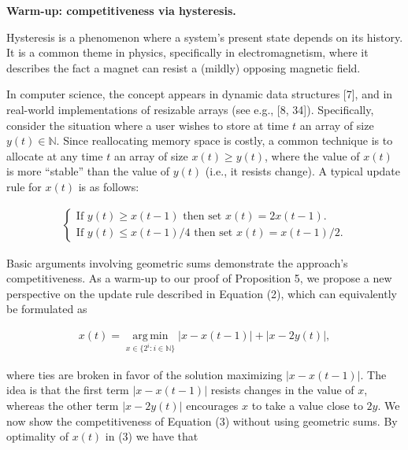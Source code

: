 


\par\medskip\noindent\textbf{Warm-up: competitiveness via hysteresis.}\par




Hysteresis is a phenomenon where a system’s present state depends on its history. It is a common theme in physics, specifically in electromagnetism, where it describes the fact a magnet can resist a (mildly) opposing magnetic field.\par




In computer science, the concept appears in dynamic data structures [7], and in real-world implementations of resizable arrays (see e.g., [8, 34]). Specifically, consider the situation where a user wishes to store at time $t$ an array of size $y(t)\in\mathbb{N}$. Since reallocating memory space is costly, a common technique is to allocate at any time $t$ an array of size $x(t)\geq y(t)$, where the value of $x(t)$ is more “stable” than the value of $y(t)$ (i.e., it resists change). A typical update rule for $x(t)$ is as follows:\par


\[\begin{gathered}
\begin{cases}\text{If }y(t)\geq x(t-1)\text{ then set }x(t)=2x(t-1).\\
\text{If }y(t)\leq x(t-1)/4\text{ then set }x(t)=x(t-1)/2.\end{cases}
\end{gathered}\]


Basic arguments involving geometric sums demonstrate the approach’s competitiveness.
As a warm-up to our proof of Proposition 5, we propose a new perspective on the update rule described in Equation (2), which can equivalently be formulated as\par


\[\begin{gathered}
x(t)=\operatorname*{arg\,min}_{x\in\{2^{i}\colon i\in\mathbb{N}\}}|x-x(t-1)|+|x-2y(t)|,
\end{gathered}\]


where ties are broken in favor of the solution maximizing $|x-x(t-1)|$. The idea is that the first term $|x-x(t-1)|$ resists changes in the value of $x$, whereas the other term $|x-2y(t)|$ encourages $x$ to take a value close to $2y$. We now show the competitiveness of Equation (3) without using geometric sums. By optimality of $x(t)$ in (3) we have that\par


